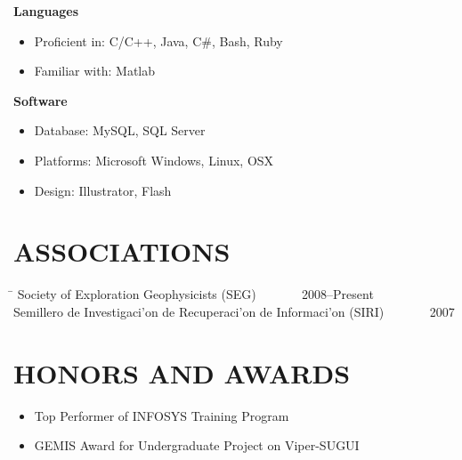 \documentclass{res}
\begin{document}
\begin{resume}
    \textbf{Languages}\\
	\vspace{-0.1 in}	
    \begin{itemize}
    	\item Proficient in: C/C++, Java, C\#, Bash, Ruby
    	\item Familiar with: Matlab
    \end{itemize}

	\textbf{Software}
	\begin{itemize}
		\item Database: MySQL, SQL Server
		\item Platforms: Microsoft Windows, Linux, OSX
		\item Design: Illustrator, Flash
	\end{itemize} 

\section{ASSOCIATIONS}

\begin{tabbing}

\hspace{4.9in}\= \kill %
Society of Exploration Geophysicists (SEG) \> ~~~~~~ 2008--Present\\
Semillero de Investigaci\a'on de Recuperaci\a'on de Informaci\a'on (SIRI) \> ~~~~~~ 2007\\
\end{tabbing}\vspace{-15pt}


% 

\section{HONORS AND AWARDS}          
\begin{itemize}
	\item Top Performer of INFOSYS Training Program
	\item GEMIS Award for Undergraduate Project on Viper-SUGUI
\end{itemize}



\end{resume}
\end{document}
